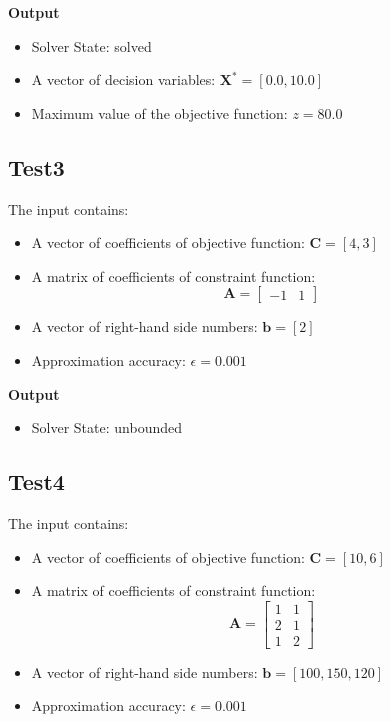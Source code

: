\documentclass[12pt, legalpaper]{exam}
\begin{document}
\noindent  \textbf{Output}
\begin{itemize}
    \item Solver State: solved
    \item A vector of decision variables: $\mathbf{X^*} = [0.0, 10.0]$
    \item Maximum value of the objective function: $z = 80.0$
\end{itemize}

\vspace{1cm}

\subsection*{Test3}
The input contains:
\begin{itemize}
    \item A vector of coefficients of objective function: $\mathbf{C} = [4, 3]$
    \item A matrix of coefficients of constraint function:
    \[
    \mathbf{A} =
    \begin{bmatrix}
    -1 & 1
    \end{bmatrix}
    \]
    \item A vector of right-hand side numbers: $\mathbf{b} = [2]$
    \item Approximation accuracy: $\epsilon = 0.001$
\end{itemize}

\noindent  \textbf{Output}
\begin{itemize}
    \item Solver State: unbounded
\end{itemize}

\vspace{1cm}


\subsection*{Test4}
The input contains:
\begin{itemize}
    \item A vector of coefficients of objective function: $\mathbf{C} = [10, 6]$
    \item A matrix of coefficients of constraint function:
    \[
    \mathbf{A} =
    \begin{bmatrix}
    1 & 1 \\
    2 & 1 \\
    1 & 2
    \end{bmatrix}
    \]
    \item A vector of right-hand side numbers: $\mathbf{b} = [100, 150, 120]$
    \item Approximation accuracy: $\epsilon = 0.001$
\end{itemize}
\end{document}
